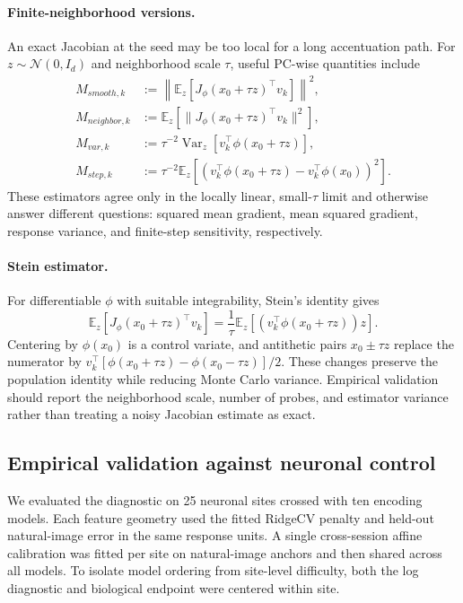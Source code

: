 \paragraph{Finite-neighborhood versions.}
An exact Jacobian at the seed may be too local for a long accentuation path.
For $z\sim\mathcal N(0,I_d)$ and neighborhood scale $\tau$, useful
PC-wise quantities include
\begin{align}
M_{smooth,k}
  &:=\left\|\mathbb E_z[J_\phi(x_0+\tau z)^\top v_k]\right\|^2,\\
M_{neighbor,k}
  &:=\mathbb E_z\left[\|J_\phi(x_0+\tau z)^\top v_k\|^2\right],\\
M_{var,k}
  &:=\tau^{-2}\operatorname{Var}_z[v_k^\top\phi(x_0+\tau z)],\\
M_{step,k}
  &:=\tau^{-2}\mathbb E_z\left[
       (v_k^\top\phi(x_0+\tau z)-v_k^\top\phi(x_0))^2\right].
\label{eq:nonlinear-neighborhood-estimators}
\end{align}
These estimators agree only in the locally linear, small-$\tau$ limit and
otherwise answer different questions: squared mean gradient, mean squared
gradient, response variance, and finite-step sensitivity, respectively.

\paragraph{Stein estimator.}
For differentiable $\phi$ with suitable integrability, Stein's identity gives
\begin{equation}
\mathbb E_z[J_\phi(x_0+\tau z)^\top v_k]
=\frac{1}{\tau}\mathbb E_z[(v_k^\top\phi(x_0+\tau z))z].
\label{eq:nonlinear-stein-estimator}
\end{equation}
Centering by $\phi(x_0)$ is a control variate, and antithetic pairs
$x_0\pm\tau z$ replace the numerator by
$v_k^\top[\phi(x_0+\tau z)-\phi(x_0-\tau z)]/2$.  These changes preserve
the population identity while reducing Monte Carlo variance.  Empirical
validation should report the neighborhood scale, number of probes, and
estimator variance rather than treating a noisy Jacobian estimate as exact.

\subsection{Empirical validation against neuronal control}
\label{sec:app-nonlinear-biological-validation}
We evaluated the diagnostic on 25 neuronal sites crossed with ten encoding
models. Each feature geometry used the fitted RidgeCV penalty and held-out
natural-image error in the same response units. A single cross-session affine
calibration was fitted per site on natural-image anchors and then shared
across all models. To isolate model ordering from site-level difficulty, both
the log diagnostic and biological endpoint were centered within site.

